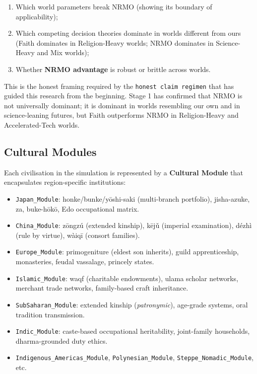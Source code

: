 \begin{enumerate}
\item Which world parameters break NRMO (showing its boundary of
applicability);
\item Which competing decision theories dominate in worlds different
from ours (Faith dominates in Religion-Heavy worlds; NRMO dominates
in Science-Heavy and Mix worlds);
\item Whether \textbf{NRMO advantage} is robust or brittle across
worlds.
\end{enumerate}

This is the honest framing required by the
\texttt{honest claim regimen} that has guided this research from the
beginning. Stage 1 has confirmed that NRMO is not universally
dominant; it is dominant in worlds resembling our own and in
science-leaning futures, but Faith outperforms NRMO in Religion-Heavy
and Accelerated-Tech worlds.

\subsection{Cultural Modules}
\label{sec:vision-cultural-modules}

Each civilisation in the simulation is represented by a
\textbf{Cultural Module} that encapsulates region-specific
institutions:

\begin{itemize}[itemsep=2pt]
\item \texttt{Japan\_Module}: honke/bunke/yōshi-saki (multi-branch
portfolio), jisha-azuke, za, buke-hōkō, Edo occupational matrix.
\item \texttt{China\_Module}: zōngzú (extended kinship), kējǔ
(imperial examination), dézhì (rule by virtue), wàiqī (consort
families).
\item \texttt{Europe\_Module}: primogeniture (eldest son inherits),
guild apprenticeship, monasteries, feudal vassalage, princely
states.
\item \texttt{Islamic\_Module}: waqf (charitable endowments),
ulama scholar networks, merchant trade networks, family-based
craft inheritance.
\item \texttt{SubSaharan\_Module}: extended kinship
(\textit{patronymic}), age-grade systems, oral tradition transmission.
\item \texttt{Indic\_Module}: caste-based occupational
heritability, joint-family households, dharma-grounded duty
ethics.
\item \texttt{Indigenous\_Americas\_Module}, \texttt{Polynesian\_Module},
\texttt{Steppe\_Nomadic\_Module}, etc.
\end{itemize}

